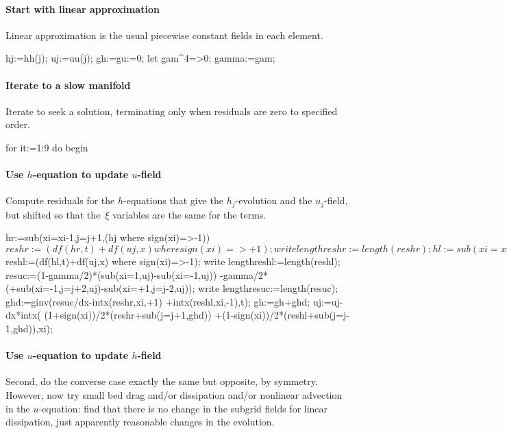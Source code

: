 \documentclass[10pt,a5paper]{article}
\begin{document}
\paragraph{Start with linear approximation}
Linear approximation is the usual piecewise constant fields in each element.
\begin{reduce}
hj:=hh(j); uj:=uu(j);
gh:=gu:=0;
let gam^4=>0;
gamma:=gam;
\end{reduce}

\paragraph{Iterate to a slow manifold}
Iterate to seek a solution, terminating only when residuals are zero to specified order.
\begin{reduce}
for it:=1:9 do begin
\end{reduce}

\paragraph{Use $h$-equation to update $u$-field}
Compute residuals for the $h$-equations that give the $h_j$-evolution and the $u_j$-field, but shifted so that the~$\xi$
variables are the same for the terms.  

\begin{reduce}
hr:=sub({xi=xi-1,j=j+1},(hj where sign(xi)=>-1))$
reshr:=(df(hr,t)+df(uj,x) where sign(xi)=>+1);
write lengthreshr:=length(reshr);
hl:=sub({xi=xi+1,j=j-1},(hj  where sign(xi)=>+1))$
reshl:=(df(hl,t)+df(uj,x) where sign(xi)=>-1);
write lengthreshl:=length(reshl);
resuc:=(1-gamma/2)*(sub(xi=1,uj)-sub(xi=-1,uj))
         -gamma/2*(+sub({xi=-1,j=j+2},uj)-sub({xi=+1,j=j-2},uj));
write lengthresuc:=length(resuc);
ghd:=ginv(resuc/dx-intx(reshr,xi,+1)
                  +intx(reshl,xi,-1),t);
gh:=gh+ghd;
uj:=uj-dx*intx( (1+sign(xi))/2*(reshr+sub(j=j+1,ghd))
               +(1-sign(xi))/2*(reshl+sub(j=j-1,ghd)),xi);
\end{reduce}

\paragraph{Use $u$-equation to update $h$-field}
Second, do the converse case exactly the same but opposite, by symmetry.  However, now try small bed drag and/or dissipation and/or nonlinear advection in the $u$-equation: find that there is no change in the subgrid fields for linear dissipation, just apparently reasonable changes in the evolution.  
\end{document}
